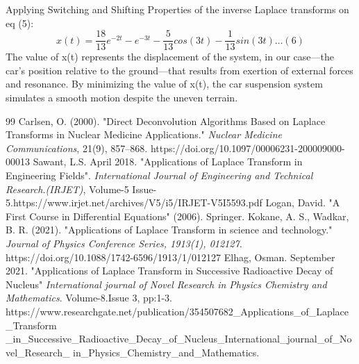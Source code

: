 \documentclass[12pt]{article}
\theoremstyle{plain}
\theoremstyle{definition}
\begin{document}
Applying Switching and Shifting Properties of the inverse Laplace transforms on eq (5):
\begin{equation*}
x(t)= \frac{18}{13} e^{-2t} - e^{-3t}-\frac{5}{13}cos (3t) - \frac{1}{13} sin (3t) \dots (6)
\end{equation*}
The value of x(t) represents the displacement of the system, in our case---the car's position relative to the ground---that results from exertion of external forces and resonance. By minimizing the value of x(t), the car suspension system simulates a smooth motion despite the uneven terrain.
\newpage
\begin{thebibliography}{99}
Carlsen, O. (2000). "Direct Deconvolution Algorithms Based on Laplace Transforms in Nuclear Medicine Applications." \textit{Nuclear Medicine Communications}, 21(9), 857–868. https://doi.org/10.1097/00006231-200009000-00013
Sawant, L.S. April 2018. "Applications of Laplace Transform in Engineering Fields". \textit{International Journal of Engineering and Technical Research.(IRJET)}, Volume-5 Issue-5.https://www.irjet.net/archives/V5/i5/IRJET-V5I5593.pdf
Logan, David. "A First Course in Differential Equations" (2006). Springer.
Kokane, A. S., Wadkar, B. R. (2021). "Applications of Laplace Transform in science and technology." \textit{Journal of Physics Conference Series, 1913(1), 012127.} https://doi.org/10.1088/1742-6596/1913/1/012127
Elhag, Osman. September 2021. "Applications of Laplace Transform in Successive Radioactive Decay of Nucleus" \textit{ International journal of Novel Research in Physics Chemistry and Mathematics}. Volume-8.Issue 3, pp:1-3. https://www.researchgate.net/publication/354507682\_Applications\_of\_Laplace\_Transform
\_in\_Successive\_Radioactive\_Decay\_of\_Nucleus\_International\_journal\_of\_Novel\_Research\_
in\_Physics\_Chemistry\_and\_Mathematics.
\end{thebibliography}
\end{document}
